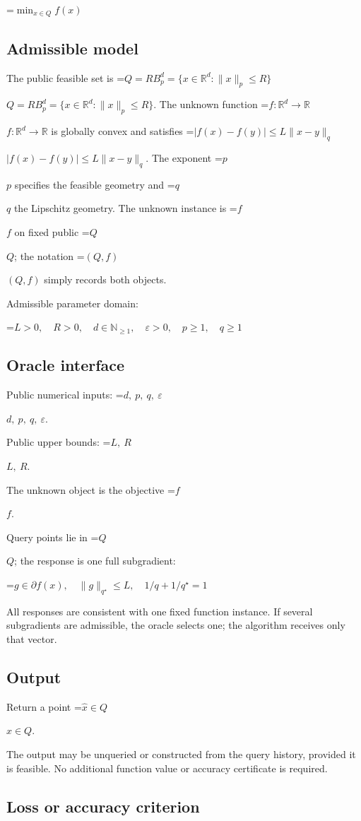 \documentclass[10pt,a4paper]{article}
\newcommand{\AtlasMath}[1]{\par\begingroup\centering\setbox0=\hbox{$\displaystyle #1$}\ifdim\wd0>1.4\linewidth\typeout{ATLAS WIDE FORMULA: \the\wd0}\fi\ifdim\wd0>\linewidth\resizebox{\linewidth}{!}{\box0}\else\box0\fi\par\endgroup}
\newcommand{\AtlasInlineMath}[1]{\begingroup\setbox0=\hbox{$#1$}\ifdim\wd0>.4\linewidth\endgroup\AtlasMath{#1}\else\endgroup$#1$\fi}
\begin{document}
\AtlasMath{\min_{x\in Q}f(x)}


\subsection{Admissible model}
The public feasible set is \AtlasInlineMath{Q=RB_p^d=\{x\in\mathbb R^d:\|x\|_p\le R\}}. The unknown function \AtlasInlineMath{f:\mathbb R^d\to\mathbb R} is globally convex and satisfies \AtlasInlineMath{|f(x)-f(y)|\le L\|x-y\|_q}. The exponent \AtlasInlineMath{p} specifies the feasible geometry and \AtlasInlineMath{q} the Lipschitz geometry. The unknown instance is \AtlasInlineMath{f} on fixed public \AtlasInlineMath{Q}; the notation \AtlasInlineMath{(Q,f)} simply records both objects.

Admissible parameter domain:


\AtlasMath{L>0,\quad R>0,\quad d\in\mathbb{N}_{\ge1},\quad \varepsilon>0,\quad p\ge1,\quad q\ge1}


\subsection{Oracle interface}
Public numerical inputs: \AtlasInlineMath{d,\ p,\ q,\ \varepsilon}.

Public upper bounds: \AtlasInlineMath{L,\ R}.

The unknown object is the objective \AtlasInlineMath{f}.

Query points lie in \AtlasInlineMath{Q}; the response is one full subgradient:


\AtlasMath{g\in\partial f(x),\quad\|g\|_{q^\star}\le L,\quad1/q+1/q^\star=1}


All responses are consistent with one fixed function instance. If several subgradients are admissible, the oracle selects one; the algorithm receives only that vector.

\subsection{Output}
Return a point \AtlasInlineMath{\widehat x\in Q}.

The output may be unqueried or constructed from the query history, provided it is feasible. No additional function value or accuracy certificate is required.

\subsection{Loss or accuracy criterion}
\end{document}
